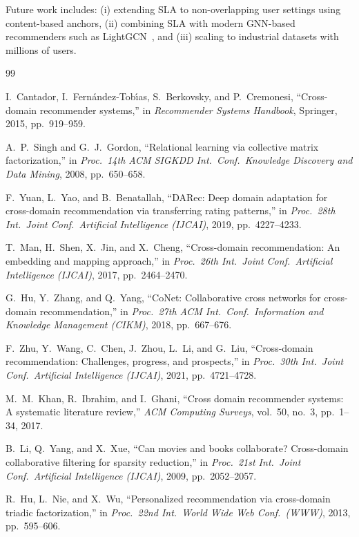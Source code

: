 \documentclass[conference]{IEEEtran}
\begin{document}
Future work includes: (i) extending SLA to non-overlapping user settings using content-based anchors, (ii) combining SLA with modern GNN-based recommenders such as LightGCN~\cite{he2020}, and (iii) scaling to industrial datasets with millions of users.

\begin{thebibliography}{99}

I.~Cantador, I.~Fern{\'a}ndez-Tob{\'\i}as, S.~Berkovsky, and P.~Cremonesi, ``Cross-domain recommender systems,'' in \emph{Recommender Systems Handbook}, Springer, 2015, pp.~919--959.

A.~P.~Singh and G.~J.~Gordon, ``Relational learning via collective matrix factorization,'' in \emph{Proc.\ 14th ACM SIGKDD Int.\ Conf.\ Knowledge Discovery and Data Mining}, 2008, pp.~650--658.

F.~Yuan, L.~Yao, and B.~Benatallah, ``DARec: Deep domain adaptation for cross-domain recommendation via transferring rating patterns,'' in \emph{Proc.\ 28th Int.\ Joint Conf.\ Artificial Intelligence (IJCAI)}, 2019, pp.~4227--4233.

T.~Man, H.~Shen, X.~Jin, and X.~Cheng, ``Cross-domain recommendation: An embedding and mapping approach,'' in \emph{Proc.\ 26th Int.\ Joint Conf.\ Artificial Intelligence (IJCAI)}, 2017, pp.~2464--2470.

G.~Hu, Y.~Zhang, and Q.~Yang, ``CoNet: Collaborative cross networks for cross-domain recommendation,'' in \emph{Proc.\ 27th ACM Int.\ Conf.\ Information and Knowledge Management (CIKM)}, 2018, pp.~667--676.

F.~Zhu, Y.~Wang, C.~Chen, J.~Zhou, L.~Li, and G.~Liu, ``Cross-domain recommendation: Challenges, progress, and prospects,'' in \emph{Proc.\ 30th Int.\ Joint Conf.\ Artificial Intelligence (IJCAI)}, 2021, pp.~4721--4728.

M.~M.~Khan, R.~Ibrahim, and I.~Ghani, ``Cross domain recommender systems: A systematic literature review,'' \emph{ACM Computing Surveys}, vol.~50, no.~3, pp.~1--34, 2017.

B.~Li, Q.~Yang, and X.~Xue, ``Can movies and books collaborate? Cross-domain collaborative filtering for sparsity reduction,'' in \emph{Proc.\ 21st Int.\ Joint Conf.\ Artificial Intelligence (IJCAI)}, 2009, pp.~2052--2057.

R.~Hu, L.~Nie, and X.~Wu, ``Personalized recommendation via cross-domain triadic factorization,'' in \emph{Proc.\ 22nd Int.\ World Wide Web Conf.\ (WWW)}, 2013, pp.~595--606.


\end{thebibliography}
\end{document}
